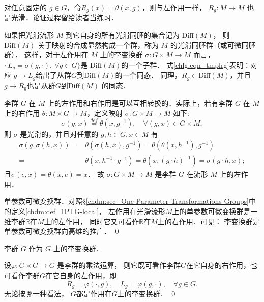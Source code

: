 对任意固定的 $g \in G$，令$R_g(x)=\theta(x,g)$，则与左作用一样，
$R_g: M \to M$ 也是光滑．论证过程留给读者当练习．

如果把光滑流形 $M$ 到它自身的所有光滑同胚的集合记为 $\mathrm{Diff}(M)$，
则 $\mathrm{Diff}(M)$ 关于映射的合成显然构成一个群，称为 $M$ 的光滑{\heiti 同胚群}（或可微同胚群）．
这样，对于左作用在 $M$ 上的李变换群 $\sigma: G \times M \to M$ 而言，
$\{L_g=\sigma(g,\cdot),\ \forall g \in G\}$是 $\mathrm{Diff}(M)$的一个子群．
式\eqref{chlg:eqn_tmplrg}表明：对应 $g \to L_{g}$给出了从群$G$到$\mathrm{Diff}(M)$的一个同态．
同理，$R_g \in \mathrm{Diff}(M)$，并且 $g \to R_{\mathrm{g}}$也是从群$G$到$\mathrm{Diff}(M)$ 的同态．




李群 $G$ 在 $M$ 上的左作用和右作用是可以互相转换的．实际上，若有李群 $G$ 在 $M$ 
上的右作用 $\theta: M \times G \to M$，定义映射 $\sigma: G \times M \to M$ 如下:
\begin{equation}
    \sigma(g, x)\overset{def}{=} \theta(x, g^{-1}), \quad \forall(g, x) \in G \times M,
\end{equation}
则 $\sigma$ 是光滑的，并且对任意的 $g, h \in G, x \in M$ 有
\begin{align*}
    \sigma(g, \sigma(h, x))=&\theta\left(\sigma(h, x), g^{-1}\right) 
    =  \theta\left(\theta\left(x, h^{-1}\right), g^{-1}\right) \\
    =& \theta\left(x, h^{-1} \cdot g^{-1}\right) 
    = \theta\left(x,(g \cdot h)^{-1}\right)=\sigma(g \cdot h, x) ;
\end{align*}
且$\sigma(e, x)=\theta(x, e)=x$．
故 $\sigma: G \times M \rightarrow M$ 是李群 $G$ 在流形 $M$ 上的左作用．


\begin{example}
    单参数可微变换群．对照\S\ref{chdm:sec_One-Parameter-Transformations-Groups}中的定义\ref{chdm:def_1PTG-local}，
    左作用在光滑流形$M$上的单参数可微变换群是一维李群$\mathbb{R}$在$M$上的左作用，
    同时它又可看作$\mathbb{R}$在$M$上的右作用．可见：
    李变换群是单参数可微变换群向高维的推广． \qed
\end{example}

\begin{example}
    李群 $G$ 作为 $G$ 上的李变换群．
\end{example}
设$\varphi: G \times G \rightarrow G$ 是李群的乘法运算，
则它既可看作李群$G$在它自身的右作用，也可看作李群$G$在它自身的左作用，即
\begin{equation}
    R_g=\varphi(\cdot, g), \quad L_g=\varphi(g, \cdot), \quad \forall g \in G .
\end{equation}
无论按哪一种看法， $G$都是作用在$G$上的李变换群．
\qed


